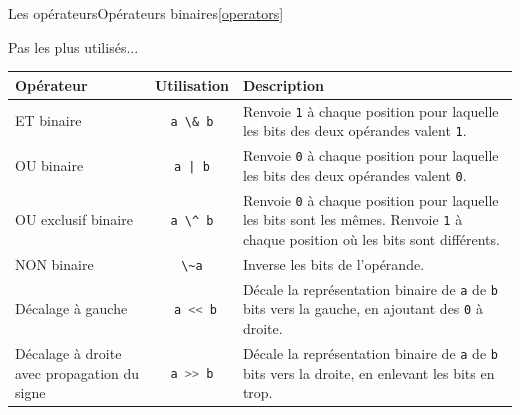 \documentclass{beamer}
\begin{document}
    \begin{frame}{Les opérateurs}{Opérateurs binaires\cref{operators}}
        \begin{scriptsize}
            Pas les plus utilisés...
            \begin{table}[h!]
                \centering
                \begin{tabular}{|p{3cm}|c|p{6cm}|}
                    \hline
                    \textbf{Opérateur}                                 & \textbf{Utilisation}                     & \textbf{Description}                                                                                                                                            \\
                    \hline
                    ET binaire                                         & \lstinline{a \& b}                       & Renvoie \lstinline{1} à chaque position pour laquelle les bits des deux opérandes valent \lstinline{1}.                                                         \\
                    \hline
                    OU binaire                                         & \lstinline{a | b}                        & Renvoie \lstinline{0} à chaque position pour laquelle les bits des deux opérandes valent \lstinline{0}.                                                         \\
                    \hline
                    OU exclusif binaire                                & \lstinline{a \^ b}                       & Renvoie \lstinline{0} à chaque position pour laquelle les bits sont les mêmes. Renvoie \lstinline{1} à chaque position où les bits sont différents.             \\
                    \hline
                    NON binaire                                        & \lstinline{\~a}                          & Inverse les bits de l'opérande.                                                                                                                                 \\
                    \hline
                    Décalage à gauche                                  & \lstinline[language=Javascript]! a << b! & Décale la représentation binaire de \lstinline{a} de \lstinline{b} bits vers la gauche, en ajoutant des \lstinline{0} à droite.                                 \\
                    \hline
                    Décalage à droite avec propagation du signe        & \lstinline[language=Javascript]!a >> b!  & Décale la représentation binaire de \lstinline{a} de \lstinline{b} bits vers la droite, en enlevant les bits en trop.                                                       \\

\end{tabular}
\end{table}
\end{scriptsize}
\end{frame}
\end{document}
